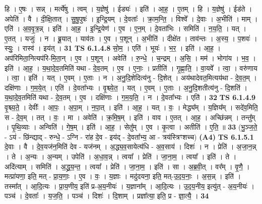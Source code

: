 \documentclass[17pt]{extarticle}
\begin{document}
                  हि । ए॒षः । सन्न् । मर्त्ये॑षु । त्वम् । य॒ज्ञेषु॑ । ईड्यः॑ । इति॑ । आ॒ह॒ । ए॒तम् । हि । य॒ज्ञेषु॑ । ईड॑ते । अपेति॑ । वै । दी॒क्षि॒तात् । सु॒षु॒पुषः॑ । इ॒न्द्रि॒यम् । दे॒वताः᳚ । क्रा॒म॒न्ति॒ । विश्वे᳚ । दे॒वाः । अ॒भीति॑ । माम् । एति॑ । अ॒व॒वृ॒त्र॒न्न् । इति॑ । आ॒ह॒ । इ॒न्द्रि॒येण॑ । ए॒व । ए॒न॒म् । दे॒वता॑भिः । समिति॑ । न॒य॒ति॒ । यत् । ए॒तत् । यजुः॑ । न । ब्रू॒यात् । याव॑तः । ए॒व । प॒शून् । अ॒भीति॑ । दीक्षे॑त । ताव॑न्तः । अ॒स्य॒ । प॒शवः॑ । स्युः॒ । रास्व॑ । इय॑त् । \textbf{  31} \newline
                  \newline
                                \textbf{ TS 6.1.4.8} \newline
                  सो॒म॒ । एति॑ । भूयः॑ । भ॒र॒ । इति॑ । आ॒ह॒ । अप॑रिमिता॒नित्यप॑रि-मि॒ता॒न् । ए॒व । प॒शून् । अवेति॑ । रु॒न्धे॒ । च॒न्द्रम् । अ॒सि॒ । मम॑ । भोगा॑य । भ॒व॒ । इति॑ । आ॒ह॒ । य॒था॒दे॒व॒तमिति॑ यथा - दे॒व॒तम् । ए॒व । ए॒नाः॒ । प्रतीति॑ । गृ॒ह्णा॒ति॒ । वा॒यवे᳚ । त्वा॒ । वरु॑णाय । त्वा॒ । इति॑ । यत् । ए॒वम् । ए॒ताः । न । अ॒नु॒दि॒शेदित्य॑नु - दि॒शेत् । अय॑थादेवत॒मित्यय॑था - दे॒व॒त॒म् । दक्षि॑णाः । ग॒म॒ये॒त् । एति॑ । दे॒वता᳚भ्यः । वृ॒श्च्ये॒त॒ । यत् । ए॒वम् । ए॒ताः । अ॒नु॒दि॒शतीत्य॑नु - दि॒शति॑ । य॒था॒दे॒व॒तमिति॑ यथा - दे॒व॒तम् । ए॒व । दक्षि॑णाः । ग॒म॒य॒ति॒ । न । दे॒वता᳚भ्यः । एति॑ । \textbf{  32 } \newline
                  \newline
                                \textbf{ TS 6.1.4.9} \newline
                  वृ॒श्च्य॒ते॒ । देवीः᳚ । आ॒पः॒ । अ॒पा॒म् । न॒पा॒त् । इति॑ । आ॒ह॒ । यत् । वः॒ । मेद्ध्य᳚म् । य॒ज्ञिय᳚म् । सदे॑व॒मिति॒ स - दे॒व॒म् । तत् । वः॒ । मा । अवेति॑ । क्र॒मि॒ष॒म् । इति॑ । वाव । ए॒तत् । आ॒ह॒ । अच्छि॑न्नम् । तन्तु᳚म् । पृ॒थि॒व्याः । अन्विति॑ । गे॒ष॒म् । इति॑ । आ॒ह॒ । सेतु᳚म् । ए॒व । कृ॒त्वा । अतीति॑ । ए॒ति॒ ॥ \textbf{  33 } \newline
                  \newline
                      (भु॒ञ्ज॒ते॒ - ऽयं - छि॑न्द्याद् - रुन्धे॒ - ऽग्नि - रा॑ह दे॒व - इय॑द् - दे॒वता᳚भ्य॒ आ - त्रय॑स्त्रिꣳशच्च)  \textbf{(A4)} \newline \newline
                                \textbf{ TS 6.1.5.1} \newline
                  दे॒वाः । वै । दे॒व॒यज॑न॒मिति॑ देव - यज॑नम् । अ॒द्ध्य॒व॒सायेत्य॑धि - अ॒व॒साय॑ । दिशः॑ । न । प्रेति॑ । अ॒जा॒न॒न्न् । ते । अ॒न्यः । अ॒न्यम् । उपेति॑ । अ॒धा॒व॒न्न् । त्वया᳚ । प्रेति॑ । जा॒ना॒म॒ । त्वया᳚ । इति॑ । ते । अदि॑त्याम् । समिति॑ । अ॒द्ध्र॒य॒न्त॒ । त्वया᳚ । प्रेति॑ । जा॒ना॒म॒ । इति॑ । सा । अ॒ब्र॒वी॒त् । वर᳚म् । वृ॒णै॒ । मत्प्रा॑यणा॒ इति॒ मत् - प्रा॒य॒णाः॒ । ए॒व । वः॒ । य॒ज्ञाः । मदु॑दयना॒ इति॒ मत्-उ॒द॒य॒नाः॒ । अ॒स॒न्न् । इति॑ । तस्मा᳚त् । आ॒दि॒त्यः । प्रा॒य॒णीय॒ इति॑ प्र-अ॒य॒नीयः॑ । य॒ज्ञाना᳚म् । आ॒दि॒त्यः । उ॒द॒य॒नीय॒ इत्यु॑त् - अ॒य॒नीयः॑ । पञ्च॑ । दे॒वताः᳚ । य॒ज॒ति॒ । पञ्च॑ । दिशः॑ । दि॒शाम् । प्रज्ञा᳚त्या॒ इति॒ प्र - ज्ञा॒त्यै॒ । \textbf{  34} \newline
\end{document}
